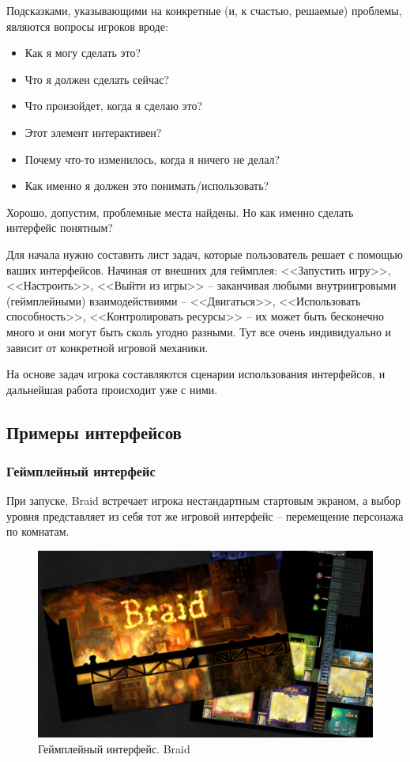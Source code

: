 \documentclass{article}
\begin{document}
Подсказками, указывающими на конкретные (и, к счастью, решаемые) проблемы, являются вопросы игроков вроде:
\begin{itemize}
  \item Как я могу сделать это?
  \item Что я должен сделать сейчас?
  \item Что произойдет, когда я сделаю это?
  \item Этот элемент интерактивен?
  \item Почему что-то изменилось, когда я ничего не делал?
  \item Как именно я должен это понимать/использовать?
\end{itemize}

Хорошо, допустим, проблемные места найдены. Но как именно сделать интерфейс понятным?

Для начала нужно составить лист задач, которые пользователь решает с помощью ваших интерфейсов. Начиная от внешних для геймплея: <<Запустить игру>>, <<Настроить>>, <<Выйти из игры>> -- заканчивая любыми внутриигровыми (геймплейными) взаимодействиями -- <<Двигаться>>, <<Использовать способность>>, <<Контролировать ресурсы>> -- их может быть бесконечно много и они могут быть сколь угодно разными. Тут все очень индивидуально и зависит от конкретной игровой механики.

На основе задач игрока составляются сценарии использования интерфейсов, и дальнейшая работа происходит уже с ними.



\subsection{Примеры интерфейсов}
\subsubsection*{Геймплейный интерфейс}
 При запуске, Braid встречает игрока нестандартным стартовым экраном, а выбор уровня представляет из себя тот же игровой интерфейс -- перемещение персонажа по комнатам.

\begin{figure}[H]
  \includegraphics[width=\textwidth]{res/img/braid.png}
  \caption{Геймплейный интерфейс. Braid}
\end{figure}
\end{document}

